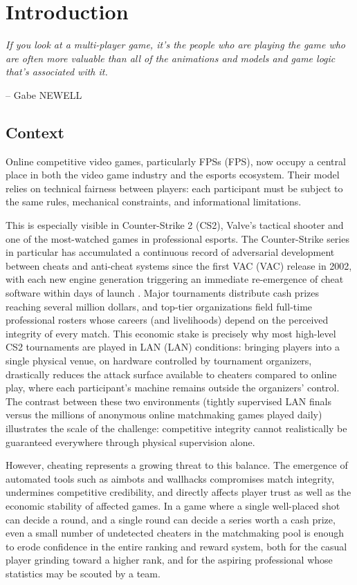 \chapter*{Introduction}
\label{chap:intro}

\epigraph{\itshape If you look at a multi-player game, it's the people who are playing the game who are often more valuable than all of the animations and models and game logic that's associated with it.}{-- Gabe NEWELL}


\section*{Context}

Online competitive video games, particularly \glspl{FPS} (FPS), now occupy a central place in both the video game industry and the \glspl{esport} ecosystem. Their model relies on technical fairness between players: each participant must be subject to the same rules, mechanical constraints, and informational limitations.

This is especially visible in \gls{Counter-Strike 2} (CS2), \gls{Valve}'s tactical shooter and one of the most-watched games in professional esports. The Counter-Strike series in particular has accumulated a continuous record of adversarial development between cheats and anti-cheat systems since the first \gls{VAC} (VAC) release in 2002, with each new engine generation triggering an immediate re-emergence of cheat software within days of launch \cite{Kuzhii2024}. Major tournaments distribute cash prizes reaching several million dollars, and top-tier organizations field full-time professional rosters whose careers (and livelihoods) depend on the perceived integrity of every match. This economic stake is precisely why most high-level CS2 tournaments are played in \gls{LAN} (LAN) conditions: bringing players into a single physical venue, on hardware controlled by tournament organizers, drastically reduces the attack surface available to cheaters compared to online play, where each participant's machine remains outside the organizers' control. The contrast between these two environments (tightly supervised LAN finals versus the millions of anonymous online matchmaking games played daily) illustrates the scale of the challenge: competitive integrity cannot realistically be guaranteed everywhere through physical supervision alone.

However, cheating represents a growing threat to this balance. The emergence of automated tools such as \glspl{aimbot} and \glspl{wallhack} compromises match integrity, undermines competitive credibility, and directly affects player trust as well as the economic stability of affected games. In a game where a single well-placed shot can decide a round, and a single round can decide a series worth a cash prize, even a small number of undetected cheaters in the matchmaking pool is enough to erode confidence in the entire ranking and reward system, both for the casual player grinding toward a higher rank, and for the aspiring professional whose statistics may be scouted by a team.

